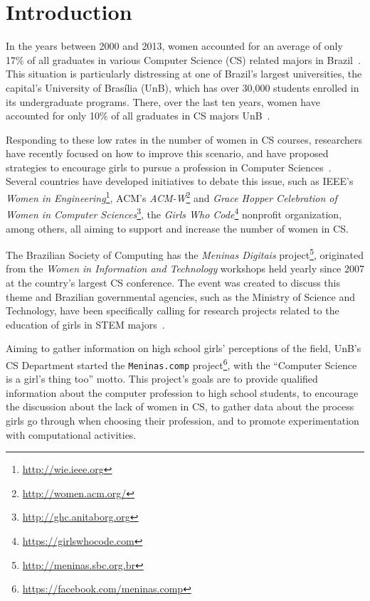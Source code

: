 \section{Introduction}\label{sec:intro}%
In the years between 2000 and 2013, women accounted for an average of only 17\% of all graduates in various Computer Science (CS) related majors in Brazil~\cite{maia_2016}. This situation is particularly distressing at one of Brazil's largest universities, the capital's University of Bras\'{i}lia (UnB), which has over 30,000 students enrolled in its undergraduate programs. There, over the last ten years, women have accounted for only 10\% of all graduates in CS majors UnB~\cite{couto_2014}.

Responding to these low rates in the number of women in CS courses, researchers have recently focused on how to improve this scenario, and have proposed strategies to encourage girls to pursue a profession in Computer Sciences~\cite{maia_2016,couto_2014,cohoon_2002,gurer_2002}. Several countries have developed initiatives to debate this issue, such as IEEE's \emph{Women in Engineering}\footnote{\url{http://wie.ieee.org}}, ACM's \emph{ACM-W}\footnote{\url{http://women.acm.org/}} and \emph{Grace Hopper Celebration of Women in Computer Sciences}\footnote{\url{http://ghc.anitaborg.org}}, the \emph{Girls Who Code}\footnote{\url{https://girlswhocode.com}} nonprofit organization, among others, all aiming to support and increase the number of women in CS.

The Brazilian Society of Computing has the \emph{Meninas Digitais} project\footnote{\url{http://meninas.sbc.org.br}}, originated from the \emph{Women in Information and Technology} workshops held yearly since 2007 at the country's largest CS conference. The event was created to discuss this theme and Brazilian governmental agencies, such as the Ministry of Science and Technology, have been specifically calling for research projects related to the education of girls in STEM majors~\cite{cnpq_2017}.

Aiming to gather information on high school girls' perceptions of the field, UnB's CS Department started the \texttt{Meninas.comp} project\footnote{\url{https://facebook.com/meninas.comp}}, with the ``Computer Science is a girl's thing too'' motto. This project's goals are to provide qualified information about the computer profession to high school students, to encourage the discussion about the lack of women in CS, to gather data about the process girls go through when choosing their profession, and to promote experimentation with computational activities.

